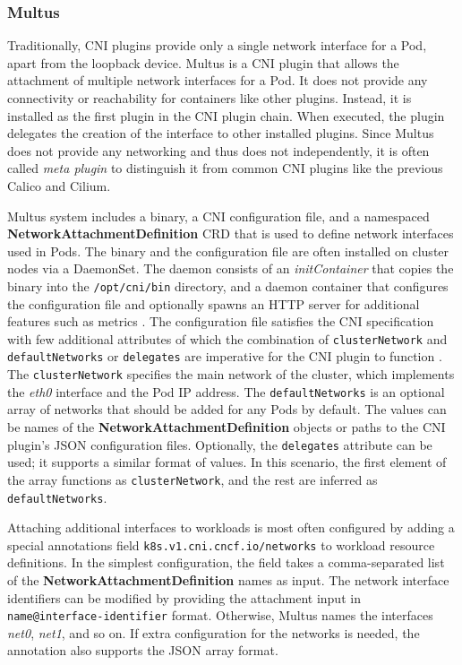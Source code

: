 \documentclass[english, 12pt, a4paper, sci, utf8, a-2b, online]{aaltothesis}
\newcommand{\mycomment}[3]{\textcolor{#1}{#2:~#3}}
\newcommand{\jb}[1]{\noindent\mycomment{aaltoRed}{JB}{#1}}
\begin{document}

\subsubsection{Multus}

Traditionally, CNI plugins provide only a single network interface for a Pod, apart from the loopback device.
Multus \cite{multus-cni} is a CNI plugin that allows the attachment of multiple network interfaces for a Pod.
It does not provide any connectivity or reachability for containers like other plugins.
Instead, it is installed as the first plugin in the CNI plugin chain.
When executed, the plugin delegates the creation of the interface to other installed plugins.
Since Multus does not provide any networking and thus does not independently, it is often called \emph{meta plugin} to distinguish it from common CNI plugins like the previous Calico and Cilium.

Multus system includes a binary, a CNI configuration file, and a namespaced \textbf{NetworkAttachmentDefinition} CRD that is used to define network interfaces used in Pods.
The binary and the configuration file are often installed on cluster nodes via a DaemonSet.
The daemon consists of an \emph{initContainer} that copies the binary into the \lstinline{/opt/cni/bin} directory, and a daemon container that configures the configuration file and optionally spawns an HTTP server for additional features such as metrics \cite{multus-cni}.
The configuration file satisfies the CNI specification with few additional attributes of which the combination of \lstinline{clusterNetwork} and \lstinline{defaultNetworks} or \lstinline{delegates} are imperative for the CNI plugin to function \cite{multus-cni-config}.
The \lstinline{clusterNetwork} specifies the main network of the cluster, which implements the \emph{eth0} interface and the Pod IP address.
The \lstinline{defaultNetworks} is an optional array of networks that should be added for any Pods by default.
The values can be names of the \textbf{NetworkAttachmentDefinition} objects or paths to the CNI plugin's JSON configuration files.
Optionally, the \lstinline{delegates} attribute can be used; it supports a similar format of values.
In this scenario, the first element of the array functions as \lstinline{clusterNetwork}, and the rest are inferred as \lstinline{defaultNetworks}.

Attaching additional interfaces to workloads is most often configured by adding a special annotations field \lstinline{k8s.v1.cni.cncf.io/networks} to workload resource definitions.
In the simplest configuration, the field takes a comma-separated list of the \textbf{NetworkAttachmentDefinition} names as input.
The network interface identifiers can be modified by providing the attachment input in \lstinline{name@interface-identifier} format.
Otherwise, Multus names the interfaces \emph{net0}, \emph{net1}, and so on.
If extra configuration for the networks is needed, the annotation also supports the JSON array format.
\end{document}
